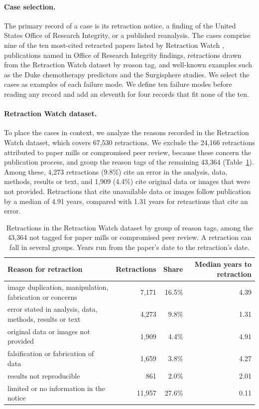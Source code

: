 \paragraph{Case selection.} The primary record of a case is its retraction notice, a finding of
the United States Office of Research Integrity, or a published reanalysis. The cases comprise
nine of the ten most-cited retracted papers listed by Retraction Watch
\citep{retractionwatch2026leaderboard}, publications named in Office of Research
Integrity findings, retractions drawn from the Retraction Watch dataset
\citep{crossref2026retractionwatchdata} by reason tag, and well-known examples such as
the Duke chemotherapy predictors and the Surgisphere studies. We select the cases as examples
of each failure mode. We define ten failure modes before reading any record and add an
eleventh for four records that fit none of the ten.

\paragraph{Retraction Watch dataset.} To place the cases in context, we analyze the reasons
recorded in the Retraction Watch dataset, which covers 67,530 retractions. We exclude the
24,166 retractions attributed to paper mills or compromised peer review, because these concern
the publication process, and group the reason tags of the remaining 43,364
(Table~\ref{tab:fc-dataset}). Among these, 4,273 retractions (9.8\%) cite an error in the
analysis, data, methods, results or text, and 1,909 (4.4\%) cite original data or images that
were not provided. Retractions that cite unavailable data or images follow publication by a
median of 4.91 years, compared with 1.31 years for retractions that cite an error.

\vspace{0.5em}
\begin{table}[h]
\centering
\small
\caption{Retractions in the Retraction Watch dataset by group of reason tags, among the 43,364
not tagged for paper mills or compromised peer review. A retraction can fall in several groups.
Years run from the paper's date to the retraction's date.}
\label{tab:fc-dataset}
\begin{tabular}{@{}>{\raggedright\arraybackslash}p{}rrr@{}}
\toprule
\textbf{Reason for retraction} & \textbf{Retractions} & \textbf{Share} & \textbf{Median years to retraction} \\
\midrule
image duplication, manipulation, fabrication or concerns & 7,171 & 16.5\% & 4.39 \\
error stated in analysis, data, methods, results or text & 4,273 & 9.8\% & 1.31 \\
original data or images not provided & 1,909 & 4.4\% & 4.91 \\
falsification or fabrication of data & 1,659 & 3.8\% & 4.27 \\
results not reproducible & 861 & 2.0\% & 2.01 \\
limited or no information in the notice & 11,957 & 27.6\% & 0.11 \\
\bottomrule
\end{tabular}
\end{table}

